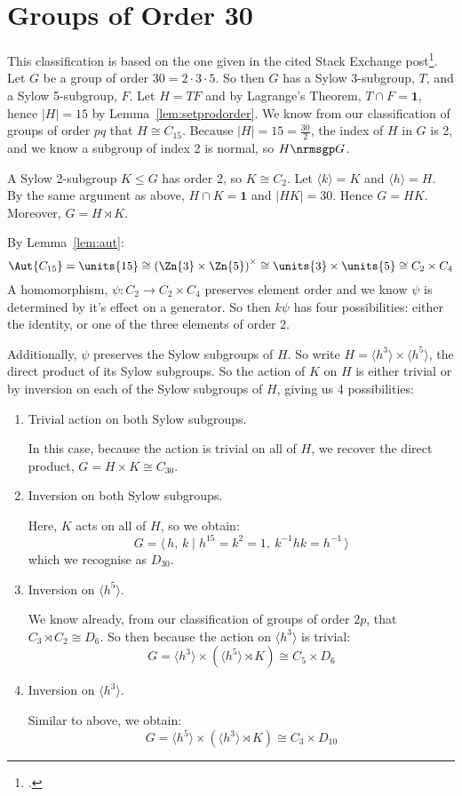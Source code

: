 \section{Groups of Order 30}
This classification is based on the one given in the cited Stack Exchange post\footcite{order30}.
Let \(G\) be a group of order \(30 = 2 \cdot 3 \cdot 5\).
So then \(G\) has a Sylow 3-subgroup, \(T\), and a Sylow 5-subgroup, \(F\).
Let \(H = TF\) and by Lagrange's Theorem, \(T \cap F = \bm{1}\), hence \(|H| = 15\) by Lemma~\ref{lem:setprodorder}.
We know from our classification of groups of order \(pq\) that \(H \cong C_{15}\).
Because \(|H| = 15 = \frac{30}{2}\), the index of \(H\) in \(G\) is 2, and we know a subgroup of index 2 is normal, so \(H \nrmsgp G\).

A Sylow 2-subgroup \(K \leqslant G\) has order 2, so \(K \cong C_2\).
Let \(\langle k \rangle = K\) and \(\langle h \rangle = H\).
By the same argument as above, \(H \cap K = \bm{1}\) and \(|HK| = 30\).
Hence \(G = HK\).
Moreover, \(G = H \rtimes K\).

By Lemma~\ref{lem:aut}:
\[\Aut{C_{15}} = \units{15} \cong {(\Zn{3} \times \Zn{5})}^\times \cong \units{3} \times \units{5} \cong C_2 \times C_4\]
A homomorphism, \(\psi:C_2 \to C_2 \times C_4\) preserves element order and we know \(\psi\) is determined by it's effect on a generator.
So then \(k\psi\) has four possibilities: either the identity, or one of the three elements
of order 2.

Additionally, \(\psi\) preserves the Sylow subgroups of \(H\).
So write \(H = \langle h^3 \rangle \times \langle h^5 \rangle\), the direct product of its Sylow subgroups.
So the action of \(K\) on \(H\) is either trivial or by inversion on each of the Sylow subgroups of \(H\), giving us 4
possibilities:

\begin{enumerate}
    \item Trivial action on both Sylow subgroups.

        In this case, because the action is trivial on all of \(H\), we recover the direct product, \(G = H \times K
        \cong C_{30}\).
    \item Inversion on both Sylow subgroups.

        Here, \(K\) acts on all of \(H\), so we obtain:
        \[G = \langle\, h,\,k \mid h^{15} = k^2 = 1,\ k^{-1}hk = h^{-1}\,\rangle\]
        which we recognise as \(D_{30}\).
    \item Inversion on \(\langle h^5 \rangle\).

        We know already, from our classification of groups of order \(2p\), that \(C_3 \rtimes C_2 \cong D_6\).
        So then because the action on \(\langle h^3 \rangle\) is trivial:
        \[G = \langle h^3 \rangle \times (\langle h^5 \rangle \rtimes K) \cong C_5 \times D_6\]
    \item Inversion on \(\langle h^3 \rangle\).

        Similar to above, we obtain:
        \[G = \langle h^5 \rangle \times (\langle h^3 \rangle \rtimes K) \cong C_3 \times D_{10}\]
\end{enumerate}

